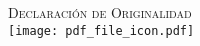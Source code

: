
\newpage
\thispagestyle{empty}
\begin{center}
  \vspace*{\fill}


  \Large\textsc{Declaración de Originalidad}\\[0.2cm]
  \texttt{[image: pdf\_file\_icon.pdf]}

  \vspace*{\fill}

\end{center}
\cleardoublepage
